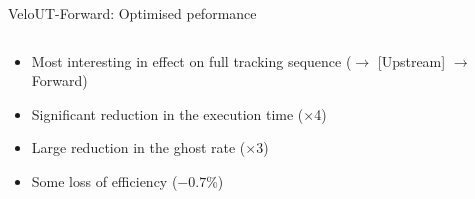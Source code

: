 \documentclass[aspectratio=1610]{beamer}
\begin{document}
\begin{frame}{VeloUT-Forward: Optimised peformance}

\begin{columns}
\begin{column}{0.65\textwidth}

\begin{itemize}
  \item Most interesting in effect on full tracking sequence (\velo $\to$ [Upstream] $\to$ Forward)
\end{itemize}

\begin{itemize}
  \item Significant reduction in the execution time ($\times$4)
  \item Large reduction in the ghost rate ($\times$3)
  \item Some loss of efficiency ($-0.7$\%)
\end{itemize}

\bigskip

\begin{mdframed}[linecolor=barcolor]
\begin{center}
\end{center}
\end{mdframed}
\end{column}


\end{columns}
\end{frame}
\end{document}
